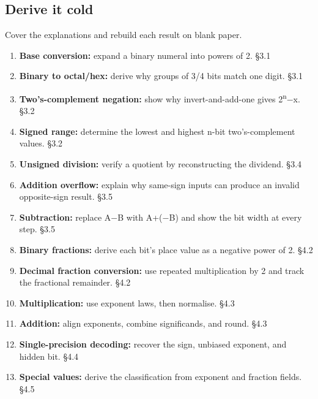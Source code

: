 \documentclass[11pt]{article}
\begin{document}
\begin{keepsection}
\section{Derive it cold}

Cover the explanations and rebuild each result on blank paper.

\begin{enumerate}
\item \textbf{Base conversion:} expand a binary numeral into powers of 2. \hfill{\small\color{FAUblue}§3.1}
\item \textbf{Binary to octal/hex:} derive why groups of 3/4 bits match one digit. \hfill{\small\color{FAUblue}§3.1}
\item \textbf{Two’s-complement negation:} show why invert-and-add-one gives 2\textsuperscript{n}\ensuremath{-}x. \hfill{\small\color{FAUblue}§3.2}
\item \textbf{Signed range:} determine the lowest and highest n-bit two’s-complement values. \hfill{\small\color{FAUblue}§3.2}
\item \textbf{Unsigned division:} verify a quotient by reconstructing the dividend. \hfill{\small\color{FAUblue}§3.4}
\item \textbf{Addition overflow:} explain why same-sign inputs can produce an invalid opposite-sign result. \hfill{\small\color{FAUblue}§3.5}
\item \textbf{Subtraction:} replace A\ensuremath{-}B with A+(\ensuremath{-}B) and show the bit width at every step. \hfill{\small\color{FAUblue}§3.5}
\item \textbf{Binary fractions:} derive each bit’s place value as a negative power of 2. \hfill{\small\color{FAUblue}§4.2}
\item \textbf{Decimal fraction conversion:} use repeated multiplication by 2 and track the fractional remainder. \hfill{\small\color{FAUblue}§4.2}
\item \textbf{Multiplication:} use exponent laws, then normalise. \hfill{\small\color{FAUblue}§4.3}
\item \textbf{Addition:} align exponents, combine significands, and round. \hfill{\small\color{FAUblue}§4.3}
\item \textbf{Single-precision decoding:} recover the sign, unbiased exponent, and hidden bit. \hfill{\small\color{FAUblue}§4.4}
\item \textbf{Special values:} derive the classification from exponent and fraction fields. \hfill{\small\color{FAUblue}§4.5}

\end{enumerate}
\end{keepsection}
\end{document}
